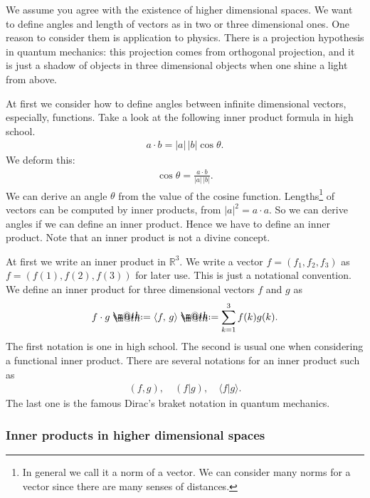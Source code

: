 \documentclass[openany, a4paper, oneside]{jsbook}
\makeatletter
\newcommand*{\defeq}{\mathrel{\rlap{%
\raisebox{0.3ex}{$\m@th\cdot$}}%
\raisebox{-0.3ex}{$\m@th\cdot$}}%
=}
\theoremstyle{break}
\theoremstyle{breakdefn}
\newcommand{\abs}[1]{\left|#1\right|}
\newcommand{\rbk}[1]{\left (#1\right)}
\newcommand{\bkt}[2]{\left\langle#1,\,#2\right\rangle}
\newcommand{\bbR}{\mathbb{R}}
\makeatother
\begin{document}
We assume you agree with the existence of higher dimensional spaces.
We want to define angles and length of vectors as in two or three dimensional ones.
One reason to consider them is application to physics.
There is a projection hypothesis in quantum mechanics:
this projection comes from orthogonal projection,
and it is just a shadow of objects in three dimensional objects when
one shine a light from above.

At first we consider how to define angles between infinite dimensional vectors,
especially, functions.
Take a look at the following inner product formula in high school.
\begin{align}
 a \cdot b
 =
 \abs{a} \, \abs{b} \cos \theta.
\end{align}
We deform this:
\begin{align}
 \cos \theta
 =
 \frac{ a \cdot b} {\abs{a} \, \abs{b}}.
\end{align}
We can derive an angle $\theta$ from the value of the cosine function.
Lengths\footnote{In general we call it a norm of a vector.
We can consider many norms for a vector since there are many senses of distances.
 } of vectors can be computed by inner products,
from $\abs{a}^2 = a \cdot a$.
So we can derive angles if we can define an inner product.
Hence we have to define an inner product.
Note that an inner product is not a divine concept.

At first we write an inner product in $\bbR^3$.
We write a vector $f = (f_1, f_2, f_3)$ as $f = (f(1), f(2), f(3))$ for later use.
This is just a notational convention.
We define an inner product for three dimensional vectors $f$ and $g$ as
\begin{align}
 f \cdot g
 \defeq
 \bkt{f}{g}
 \defeq
 \sum_{k=1}^3 f(k)g(k).
\end{align}
The first notation is one in high school.
The second is usual one when considering a functional inner product.
There are several notations for an inner product such as
\begin{align}
 \rbk{f, g}, \quad \rbk{f | g}, \quad \langle f | g \rangle.
\end{align}
The last one is the famous Dirac's braket notation in quantum mechanics.
\subsubsection{Inner products in higher dimensional spaces}
\end{document}
